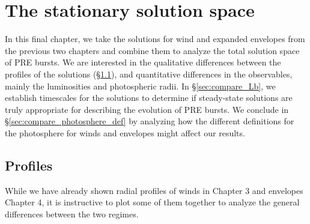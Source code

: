 \documentclass[../main.tex]{subfiles}
\begin{document}
\chapter{The stationary solution space}\label{chapter5}
In this final chapter, we take the solutions for wind and expanded envelopes from the previous two chapters and combine them to analyze the total solution space of PRE bursts. We are interested in the qualitative differences between the profiles of the solutions (\S\ref{sec:compare_profiles}), and quantitative differences in the observables, mainly the luminosities and photospheric radii. In \S\ref{sec:compare_Lb}, we establish timescales for the solutions to determine if steady-state solutions are truly appropriate for describing the evolution of PRE bursts. We conclude in \S\ref{sec:compare_photosphere_def} by analyzing how the different definitions for the photosphere for winds and envelopes might affect our results.

\section{Profiles}\label{sec:compare_profiles}
While we have already shown radial profiles of winds in Chapter 3 and envelopes Chapter 4, it is instructive to plot some of them together to analyze the general differences between the two regimes. 
\end{document}
